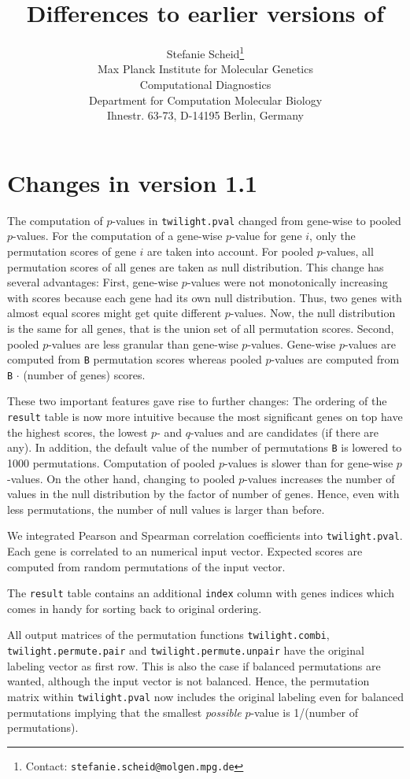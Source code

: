 \documentclass[11pt,a4paper,fleqn]{article}
\title{Differences to earlier versions of \Rpackage{twilight}}
\author{Stefanie Scheid\footnote{Contact:
        \texttt{stefanie.scheid@molgen.mpg.de}}\bigskip \\
        Max Planck Institute for Molecular Genetics\\
         Computational Diagnostics\\ Department for Computation Molecular Biology \\
         Ihnestr. 63-73, D-14195 Berlin, Germany}
\date{}
\newcommand{\Robject}[1]{{\texttt{#1}}}
\newcommand{\Rfunction}[1]{{\texttt{#1}}}
\newcommand{\Rfunarg}[1]{{\texttt{#1}}}
\begin{document}
\maketitle

\section{Changes in version 1.1}

The computation of $p$-values in \Rfunction{twilight.pval} changed from gene-wise to pooled $p$-values. For the computation of a gene-wise $p$-value for gene $i$, only the permutation scores of gene $i$ are taken into account. For pooled $p$-values, all permutation scores of all genes are taken as null distribution. This change has several advantages: First, gene-wise $p$-values were not monotonically increasing with scores because each gene had its own null distribution. Thus, two genes with almost equal scores might get quite different $p$-values. Now, the null distribution is the same for all genes, that is the union set of all permutation scores. Second, pooled $p$-values are less granular than gene-wise $p$-values. Gene-wise $p$-values are computed from \Rfunarg{B} permutation scores whereas pooled $p$-values are computed from \Rfunarg{B} $\cdot$ (number of genes) scores.

These two important features gave rise to further changes: The ordering of the \Robject{result} table is now more intuitive because the most significant genes on top have the highest scores, the lowest $p$- and $q$-values and are candidates (if there are any). In addition, the default value of the number of permutations \Rfunarg{B} is lowered to 1000 permutations. Computation of pooled $p$-values is slower than for gene-wise $p$-values. On the other hand, changing to pooled $p$-values increases the number of values in the null distribution by the factor of number of genes. Hence, even with less permutations, the number of null values is larger than before.

We integrated Pearson and Spearman correlation coefficients into \Rfunction{twilight.pval}. Each gene is correlated to an numerical input vector. Expected scores are computed from random permutations of the input vector.

The \Robject{result} table contains an additional \Robject{index} column with genes indices which comes in handy for sorting back to original ordering.

All output matrices of the permutation functions \Rfunction{twilight.combi}, \Rfunction{twilight.permute.pair} and \Rfunction{twilight.permute.unpair} have the original labeling vector as first row. This is also the case if balanced permutations are wanted, although the input vector is not balanced. Hence, the permutation matrix within \Rfunction{twilight.pval} now includes the original labeling even for balanced permutations implying that the smallest \textit{possible} $p$-value is 1/(number of permutations).
\end{document}
